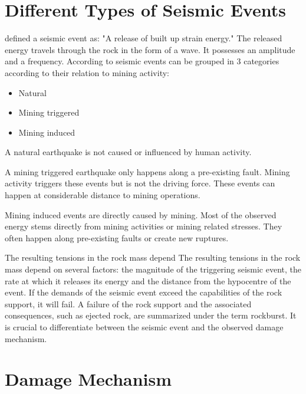 \section{Different Types of Seismic Events}
\textcite[3]{player04} defined a seismic event as: "A release of built up strain energy." %
The released energy travels through the rock in the form of a wave. It possesses an amplitude and a frequency.
 According to \textcite{durrheim06} seismic events can be grouped in 3 categories according to their relation to mining activity:
 
 \begin{itemize}
     \item Natural
     \item Mining triggered
     \item Mining induced
 \end{itemize}
 
A natural earthquake is not caused or influenced by human activity.%

A mining triggered earthquake only happens along a pre-existing fault. Mining activity triggers these events but is not the driving force.
These events can happen at considerable distance to mining operations.

Mining induced events are directly caused by mining. Most of the observed energy stems directly from mining activities or mining related stresses. They often happen along pre-existing faults or create new ruptures. 

The resulting tensions in the rock mass depend
The resulting tensions in the rock mass depend on several factors: the magnitude of the triggering seismic event, the rate at which it releases its energy and the distance from the hypocentre of the event. %
If the demands of the seismic event exceed the capabilities of the rock support, it will fail. A failure of the rock support and the associated consequences, such as ejected rock, are summarized under the term rockburst.
It is crucial to differentiate between the seismic event and the observed damage mechanism. \autocite{Kaiser12} \autocite[9]{Heal10}

\section{Damage Mechanism}

